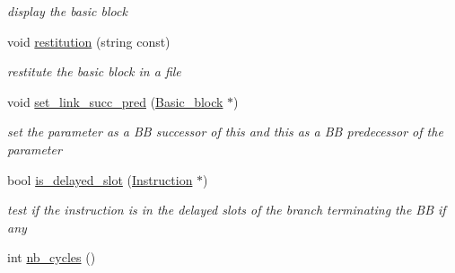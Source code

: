 \begin{DoxyCompactItemize}
\begin{DoxyCompactList}\small\item\em display the basic block \end{DoxyCompactList}\item 
\hypertarget{class_basic__block_af74c4eeeecfb7a3f3fddbeb2994523a4}{void \hyperlink{class_basic__block_af74c4eeeecfb7a3f3fddbeb2994523a4}{restitution} (string const)}\label{class_basic__block_af74c4eeeecfb7a3f3fddbeb2994523a4}

\begin{DoxyCompactList}\small\item\em restitute the basic block in a file \end{DoxyCompactList}\item 
\hypertarget{class_basic__block_acb9b80088751bcf4329b3d1532f724ac}{void \hyperlink{class_basic__block_acb9b80088751bcf4329b3d1532f724ac}{set\+\_\+link\+\_\+succ\+\_\+pred} (\hyperlink{class_basic__block}{Basic\+\_\+block} $\ast$)}\label{class_basic__block_acb9b80088751bcf4329b3d1532f724ac}

\begin{DoxyCompactList}\small\item\em set the parameter as a B\+B successor of this and this as a B\+B predecessor of the parameter \end{DoxyCompactList}\item 
\hypertarget{class_basic__block_ad156275e42428ee703ffa0aa3e8b5bb0}{bool \hyperlink{class_basic__block_ad156275e42428ee703ffa0aa3e8b5bb0}{is\+\_\+delayed\+\_\+slot} (\hyperlink{class_instruction}{Instruction} $\ast$)}\label{class_basic__block_ad156275e42428ee703ffa0aa3e8b5bb0}

\begin{DoxyCompactList}\small\item\em test if the instruction is in the delayed slots of the branch terminating the B\+B if any \end{DoxyCompactList}\item 
\hypertarget{class_basic__block_a0a9caa9a904adc7807e390308e7b939c}{int \hyperlink{class_basic__block_a0a9caa9a904adc7807e390308e7b939c}{nb\+\_\+cycles} ()}\label{class_basic__block_a0a9caa9a904adc7807e390308e7b939c}


\end{DoxyCompactItemize}
